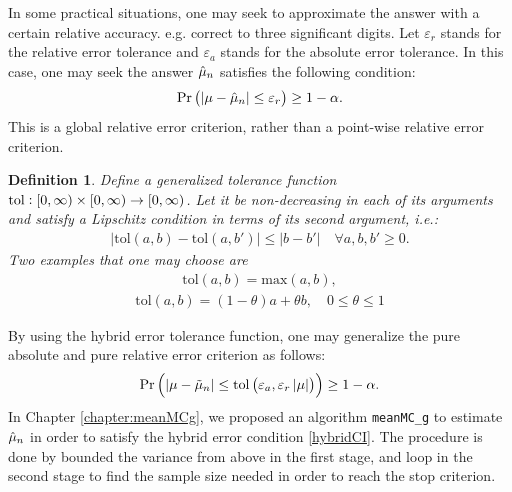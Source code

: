 \documentclass{iitthesis}
\newtheorem{defn}{Definition}[theorem]
\begin{document}
In some practical situations, one may seek to approximate the answer with a certain relative accuracy. e.g. correct to three significant digits. Let $\varepsilon_r$ stands for the relative error tolerance and $\varepsilon_a$ stands for the absolute error tolerance. In this case, one may seek the answer $\hat{\mu}_n$ satisfies the following condition:
\begin{align}\label{relCI}
\Pr\left(\left \lvert \mu-\hat{\mu}_n \right \rvert\leq \varepsilon_r\right) \geq 1-\alpha.
\end{align}
This is a global relative error criterion, rather than a point-wise relative error criterion. 
\begin{defn}\label{def:tolfun}
 Define a generalized tolerance function $\operatorname{tol}: [0, \infty) \times [0, \infty) \to [0,\infty)$. Let it be non-decreasing in each of its arguments and satisfy a Lipschitz condition in terms of its second argument, i.e.:
\begin{align}
|\text{tol}(a,b)-\text{tol}(a,b')| \leq |b-b'| \quad \forall a,b,b' \geq 0.
\end{align}
Two examples that one may choose are
\begin{align}
\text{tol}(a,b) = \text{max} (a,b),
\end{align}
\begin{align}
\text{tol}(a,b) = (1- \theta) a + \theta b, \quad 0 \leq \theta \leq 1
\end{align}
\end{defn}By using the hybrid error tolerance function, one may generalize the pure absolute and pure relative error criterion as follows:
\begin{align}\label{hybridCI}
\Pr\left(\left \lvert \mu-\tilde{\mu}_n \right \rvert\leq \operatorname{tol}\left(\varepsilon_a, \varepsilon_r\left \lvert \mu \right \rvert\right)\right) \geq 1-\alpha.
\end{align}
In Chapter \ref{chapter:meanMCg}, we proposed an algorithm {\tt meanMC\_g} to estimate $\hat{\mu}_n$ in order to satisfy the hybrid error condition \eqref{hybridCI}. The procedure is done by bounded the variance from above in the first stage, and loop in the second stage to find the sample size needed in order to reach the stop criterion.
\end{document}
